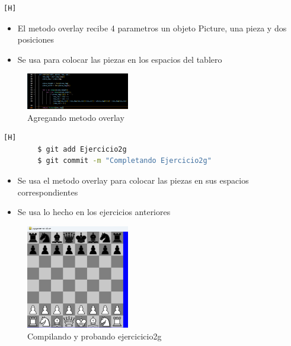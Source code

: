 \documentclass{article}
\begin{document}
 	\begin{lstlisting}[language=bash,caption={Agregando metodo overlay de  la clase Picture}][H]		
	\end{lstlisting}
	\begin{itemize}	
		\item El metodo overlay recibe 4 parametros un objeto Picture, una pieza y dos posiciones
  		\item Se usa para colocar las piezas en los espacios del tablero
	\end{itemize}
	\begin{figure}[H]
		\centering
		\includegraphics[width=0.4\textwidth,keepaspectratio]{img/overlay.png}
		\caption{Agregando metodo overlay}
	\end{figure}
        \clearpage
 	\begin{lstlisting}[language=bash,caption={Completando Ejercicio2g}][H]
		$ git add Ejercicio2g
		$ git commit -m "Completando Ejercicio2g"			
	\end{lstlisting}
	
	\begin{itemize}	
		\item Se usa el metodo overlay para colocar las piezas en sus espacios correspondientes
  		\item Se usa lo hecho en los ejercicios anteriores
	\end{itemize}
	\begin{figure}[H]
		\centering
		\includegraphics[width=0.4\textwidth,keepaspectratio]{img/2g.png}
		\caption{Compilando y probando ejercicicio2g}
	\end{figure}
\end{document}
